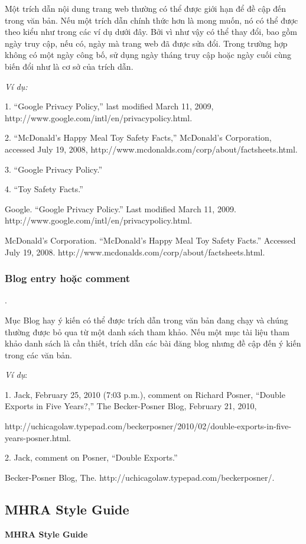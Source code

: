 \documentclass{hcmutarticle}
\begin{document}
Một trích dẫn nội dung trang web thường có thể được giới hạn để đề cập đến trong văn bản. Nếu một trích dẫn chính thức hơn là mong muốn, nó có thể được theo kiểu như trong các ví dụ dưới đây. Bởi vì như vậy có thể thay đổi, bao gồm ngày truy cập, nếu có, ngày mà trang web đã được sửa đổi. Trong trường hợp không có một ngày công bố, sử dụng ngày tháng truy cập hoặc ngày cuối cùng biến đổi như là cơ sở của trích dẫn.

{\em Ví dụ:} 

1. “Google Privacy Policy,” last modified March 11, 2009, http://www.google.com/intl/en/privacypolicy.html.

2. “McDonald’s Happy Meal Toy Safety Facts,” McDonald’s Corporation, accessed July 19, 2008, http://www.mcdonalds.com/corp/about/factsheets.html.

3. “Google Privacy Policy.”

4. “Toy Safety Facts.”

Google. “Google Privacy Policy.” Last modified March 11, 2009. http://www.google.com/intl/en/privacypolicy.html.

McDonald’s Corporation. “McDonald’s Happy Meal Toy Safety Facts.” Accessed July 19, 2008. http://www.mcdonalds.com/corp/about/factsheets.html.

\subsubsection{Blog entry hoặc comment}.

Mục Blog hay ý kiến có thể được trích dẫn trong văn bản đang chạy và chúng thường được bỏ qua từ một danh sách tham khảo. Nếu một mục tài liệu tham khảo danh sách là cần thiết, trích dẫn các bài đăng blog nhưng đề cập đến ý kiến trong các văn bản.

{\em Ví dụ}: 

1. Jack, February 25, 2010 (7:03 p.m.), comment on Richard Posner, “Double Exports in Five Years?,” The Becker-Posner Blog, February 21, 2010,

http://uchicagolaw.typepad.com/beckerposner/2010/02/double-exports-in-five-years-posner.html.

2. Jack, comment on Posner, “Double Exports.”

Becker-Posner Blog, The. http://uchicagolaw.typepad.com/beckerposner/.
\subsection{ MHRA Style  Guide }
 \textbf{MHRA Style Guide } 
\end{document}
